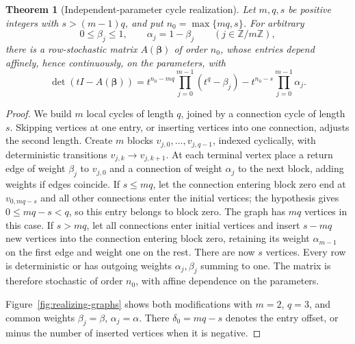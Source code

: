 \documentclass[11pt,a4paper]{article}
\newcommand{\Z}{\mathbb Z}
\newtheorem{theorem}{Theorem}[section]
\theoremstyle{definition}
\theoremstyle{remark}
\numberwithin{equation}{section}
\begin{document}
\begin{theorem}[Independent-parameter cycle realization]
\label{thm:sparse-realization}\label{thm:independent-realization}
Let $m,q,s$ be positive integers with $s>(m-1)q$, and put
$n_0=\max\{mq,s\}$. For arbitrary
\[
 0\le\beta_j\le1,\qquad \alpha_j=1-\beta_j
 \qquad(j\in\Z/m\Z),
\]
there is a row-stochastic matrix $A(\boldsymbol\beta)$ of order $n_0$,
whose entries depend affinely, hence continuously, on the parameters, with
\begin{equation}\label{eq:independent-characteristic}
 \det(tI-A(\boldsymbol\beta))
 =t^{n_0-mq}\prod_{j=0}^{m-1}(t^q-\beta_j)
  -t^{n_0-s}\prod_{j=0}^{m-1}\alpha_j.
\end{equation}
\end{theorem}
\begin{proof}
We build $m$ local cycles of length $q$, joined by a connection cycle
of length $s$. Skipping vertices at one entry, or inserting vertices
into one connection, adjusts the second length.
Create $m$ blocks $v_{j,0},\ldots,v_{j,q-1}$, indexed cyclically, with
deterministic transitions $v_{j,k}\to v_{j,k+1}$.  At each terminal vertex
place a return edge of weight $\beta_j$ to $v_{j,0}$ and a connection of
weight $\alpha_j$ to the next block, adding weights if edges coincide.
If $s\le mq$, let the connection entering block zero end at
$v_{0,mq-s}$ and all other connections enter the initial vertices;
the hypothesis gives $0\le mq-s<q$, so this entry belongs to block zero.
The graph has $mq$ vertices in this case.
If $s>mq$, let all connections enter initial vertices and insert $s-mq$
new vertices into the connection entering block zero, retaining its
weight $\alpha_{m-1}$ on the first edge and weight one on the rest.
There are now $s$ vertices. Every row is deterministic or has outgoing
weights $\alpha_j,\beta_j$ summing to one. The matrix is therefore
stochastic of order $n_0$, with affine dependence on the parameters.

Figure~\ref{fig:realizing-graphs} shows both modifications with $m=2$,
$q=3$, and common weights $\beta_j=\beta$, $\alpha_j=\alpha$.
There $\delta_0=mq-s$ denotes the entry offset, or minus the number of
inserted vertices when it is negative.


\end{proof}
\end{document}
